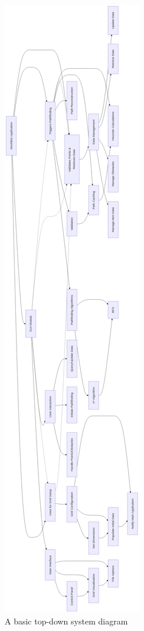\begin{figure}[!htbp]
\begin{minipage}{0.27\textwidth}
		\includegraphics[width=\linewidth]{Images/top-down-diagram.png}
		\caption{A basic top-down system diagram}
		\label{fig:topdown} %
	\end{minipage}
	
	
\end{figure}


